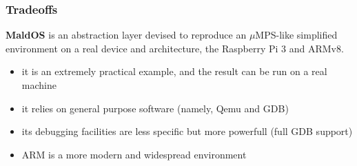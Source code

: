 \documentclass[table,xcdraw]{beamer}
\begin{document}
\begin{frame}[fragile]
    \frametitle{Tradeoffs}
    \textbf{MaldOS} is an abstraction layer devised to reproduce an $\mu$MPS-like simplified
    environment on a real device and architecture, the Raspberry Pi 3 and ARMv8.
    \begin{itemize}
        \item it is an extremely practical example, and the result can be run on a real machine
        \item it relies on general purpose software (namely, Qemu and GDB)
        \item its debugging facilities are less specific but more powerfull (full GDB support)
        \item ARM is a more modern and widespread environment
    \end{itemize}

\end{frame}
\end{document}
